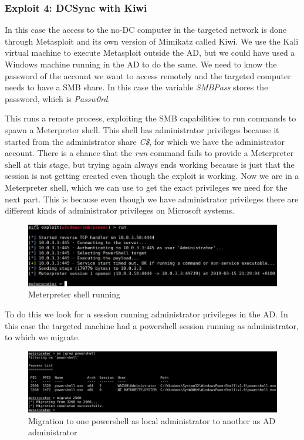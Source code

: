 \subsubsection{Exploit 4: DCSync with Kiwi}
In this case the access to the no-DC computer in the targeted network is done through Metasploit and its own version of Mimikatz called Kiwi\cite{pentestlab}. We use the Kali virtual machine to execute Metasploit outside the AD, but we could have used a Windows machine running in the AD to do the same.
\linej
We need to know the password of the account we want to access remotely and the targeted computer needs to have a SMB share.
In this case the variable \textit{SMBPass} stores the password, which is \textit{Passw0rd}.
\linej

This runs a remote process, exploiting the SMB capabilities to run commands to spawn a Meterpreter shell\cite{meterpreter}. This shell has administrator privileges because it started from the administrator share \textit{C\$}, for which we have the administrator account. There is a chance that the \textit{run} command fails to provide a Meterpreter shell at this stage, but trying again always ends working because is just that the session is not getting created even though the exploit is working.
\linej
Now we are in a Meterpreter shell, which we can use to get the exact privileges we need for the next part. This is because even though we have administrator privileges there are different kinds of administrator privileges on Microsoft systems.
\begin{figure}[H]
	\centering
	\includegraphics[width=\textwidth]{figuras/meterpreter.png}
	\caption{Meterpreter shell running}
\end{figure}
To do this we look for a session running administrator privileges in the AD. In this case the targeted machine had a powershell session running as administrator, to which we migrate.
\linej
\begin{figure}[H]
	\centering
	\includegraphics[width=\textwidth]{figuras/migrate.png}
	\caption{Migration to one powershell as local administrator to another as AD administrator}
\end{figure}
